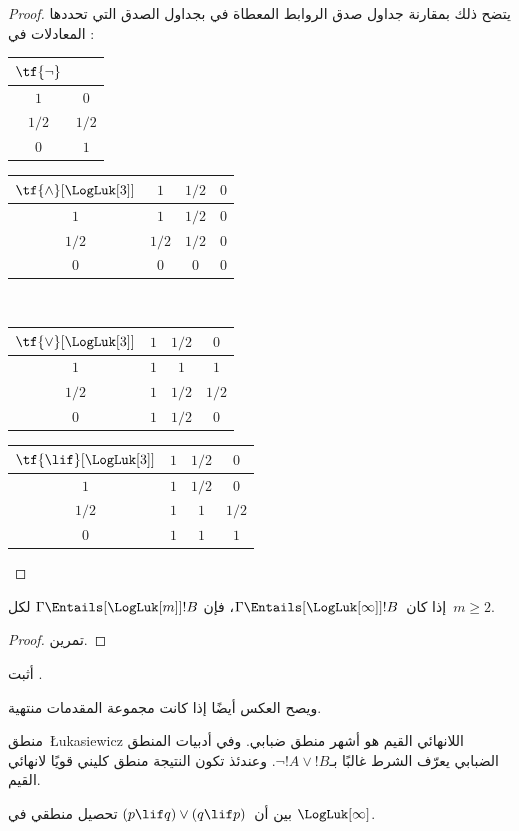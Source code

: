 \documentclass[../../../include/open-logic-section]{subfiles}
\begin{document}
\begin{proof}
  يتضح ذلك بمقارنة جداول صدق الروابط المعطاة في
   بجداول الصدق التي تحددها المعادلات
  في :
  \begin{center}
    \begin{tabular}{c|c}
      $\tf{\lnot}$ & \\
      \hline
      $1$ & $0$ \\
      $1/2$ & $1/2$ \\
      $0$ & $1$
    \end{tabular}
    \quad
    \begin{tabular}{c|ccc}
      $\tf{\land}[\LogLuk[3]]$ & $1$ & $1/2$ & $0$ \\
      \hline
      $1$ & $1$ & $1/2$ & $0$ \\
      $1/2$ & $1/2$ & $1/2$ & $0$\\
      $0$ & $0$ & $0$ & $0$
    \end{tabular}
    \\[2ex]
    \begin{tabular}{c|ccc}
      $\tf{\lor}[\LogLuk[3]]$ & $1$ & $1/2$ & $0$ \\
      \hline
      $1$ & $1$ & $1$ & $1$ \\
      $1/2$ & $1$ & $1/2$ & $1/2$ \\
      $0$ & $1$ & $1/2$ & $0$
    \end{tabular}
    \quad
    \begin{tabular}{c|ccc}
      $\tf{\lif}[\LogLuk[3]]$ & $1$ & $1/2$ & $0$ \\
      \hline
      $1$ & $1$ & $1/2$ & $0$ \\
      $1/2$ & $1$ & $1$ & $1/2$  \\
      $0$ & $1$ & $1$ & $1$
    \end{tabular}
  \end{center}
\end{proof}

\begin{prop}
  إذا كان~$\Gamma \Entails[\LogLuk[\infty]] !B$، فإن
  $\Gamma \Entails[\LogLuk[m]] !B$ لكل~$m \ge 2$.
\end{prop}

\begin{proof}
  تمرين.
\end{proof}

\begin{prob}
  أثبت .
\end{prob}

ويصح العكس أيضًا إذا كانت مجموعة المقدمات منتهية.

منطق~\L ukasiewicz اللانهائي القيم هو أشهر منطق ضبابي. وفي أدبيات
المنطق الضبابي يعرّف الشرط غالبًا بـ$\lnot !A \lor !B$. وعندئذ تكون
النتيجة منطق كليني قويًا لانهائي القيم.

\begin{prob}
  بين أن~$(p \lif q) \lor (q \lif p)$ تحصيل منطقي في
  $\LogLuk[\infty]$.
\end{prob}
\end{document}
